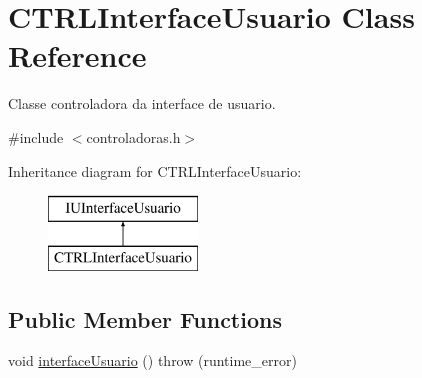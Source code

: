 \hypertarget{classCTRLInterfaceUsuario}{}\section{C\+T\+R\+L\+Interface\+Usuario Class Reference}
\label{classCTRLInterfaceUsuario}


Classe controladora da interface de usuario.  




{\ttfamily \#include $<$controladoras.\+h$>$}

Inheritance diagram for C\+T\+R\+L\+Interface\+Usuario\+:\begin{figure}[H]
\begin{center}
\leavevmode
\includegraphics[height=2.000000cm]{classCTRLInterfaceUsuario}
\end{center}
\end{figure}
\subsection*{Public Member Functions}
\begin{DoxyCompactItemize}
\item 
void \hyperlink{classCTRLInterfaceUsuario_a733e0feb4a9391c04b96bd0d7efb2ebc}{interface\+Usuario} ()  throw (runtime\+\_\+error)
\end{DoxyCompactItemize}
